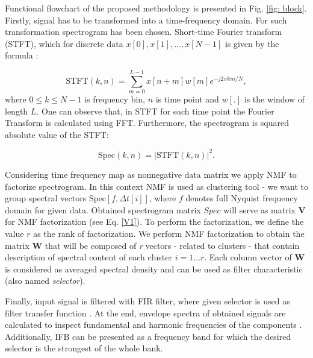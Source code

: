 \documentclass[journal]{IEEEtran}
\begin{document}

Functional flowchart of the proposed methodology is presented in Fig. \ref{fig: block}. Firstly, signal has to be transformed into a time-frequency domain. For such transformation spectrogram has been chosen. Short-time Fourier transform (STFT), which for discrete data $x[0], x[1], ... , x[N-1]$ is given by the formula \cite{allen1977short}:

\begin{equation}
    \textrm{STFT}(k,n)=\sum_{m=0}^{L-1}x[n+m]w[m]e^{-j2\pi km/N},
\end{equation}
where $0\leq k \leq N-1$ is frequency bin, $n$ is time point and  $w[.]$ is the window of length $L$. One can observe that, in STFT for each time point the Fourier Transform is calculated using FFT. Furthermore, the spectrogram is squared absolute value of the STFT:

\begin{equation}
\textrm{Spec}(k,n)=|\textrm{STFT}(k,n)|^2.
\end{equation}




Considering time frequency map as nonnegative data matrix we apply NMF to factorize spectrogram. In this context NMF is used as clustering tool - we want to group spectral vectors  $\textrm{Spec}[f,\Delta t[i]]$, where $f$ denotes full Nyquist frequency domain for given data. Obtained spectrogram matrix $Spec$ will serve as matrix $\mathbf{V}$ for NMF factorization (see Eq. \ref{V1}). To perform the factorization, we define the value $r$ as the rank of factorization. We perform NMF factorization to obtain the matrix \textbf{W} that will be composed of \textit{r} vectors - related to clusters - that contain description of spectral content of each cluster $i=1 \dots r$. Each column vector of \textbf{W} is considered as averaged spectral density and can be used as filter characteristic (also named \emph{selector}).

Finally, input signal is filtered with FIR filter, where given selector is used as filter transfer function \cite{alan1989discrete}. At the end, envelope spectra of obtained signals are calculated to inspect fundamental and harmonic frequencies of the components \cite{randall2011rolling}. Additionally, IFB can be presented as a frequency band for which the desired selector is the strongest of the whole bank.
\end{document}
